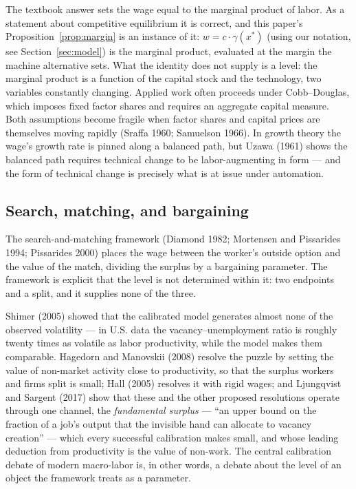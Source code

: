 \documentclass[12pt]{article}
\theoremstyle{plain}
\begin{document}
The textbook answer sets the wage equal to the marginal product of labor. As a statement about competitive equilibrium it is correct, and this paper's Proposition~\ref{prop:margin} is an instance of it: $w = c\cdot \gamma (x^*)$ (using our notation, see Section~\ref{sec:model}) is the marginal product, evaluated at the margin the machine alternative sets. What the identity does not supply is a level: the marginal product is a function of the capital stock and the technology, two variables constantly changing. Applied work often proceeds under Cobb--Douglas, which imposes fixed factor shares and requires an aggregate capital measure. Both assumptions become fragile when factor shares and capital prices are themselves moving rapidly (Sraffa 1960; Samuelson 1966). In growth theory the wage's growth rate is pinned along a balanced path, but Uzawa (1961) shows the balanced path requires technical change to be labor-augmenting in form --- and the form of technical change is precisely what is at issue under automation.

\subsection{Search, matching, and bargaining}\label{sec:search}

The search-and-matching framework (Diamond 1982; Mortensen and Pissarides 1994; Pissarides 2000) places the wage between the worker's outside option and the value of the match, dividing the surplus by a bargaining parameter. The framework is explicit that the level is not determined within it: two endpoints and a split, and it supplies none of the three.

Shimer (2005) showed that the calibrated model generates almost none of the observed volatility --- in U.S. data the vacancy--unemployment ratio is roughly twenty times as volatile as labor productivity, while the model makes them comparable. Hagedorn and Manovskii (2008) resolve the puzzle by setting the value of non-market activity close to productivity, so that the surplus workers and firms split is small; Hall (2005) resolves it with rigid wages; and Ljungqvist and Sargent (2017) show that these and the other proposed resolutions operate through one channel, the \emph{fundamental surplus} --- ``an upper bound on the fraction of a job's output that the invisible hand can allocate to vacancy creation'' --- which every successful calibration makes small, and whose leading deduction from productivity is the value of non-work. The central calibration debate of modern macro-labor is, in other words, a debate about the level of an object the framework treats as a parameter.
\end{document}
